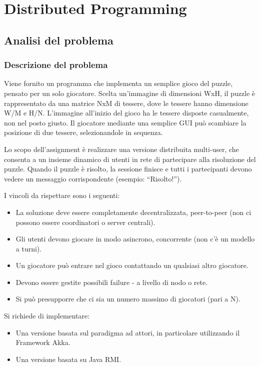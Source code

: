 \chapter{Distributed Programming}
\section{Analisi del problema}
\subsection{Descrizione del problema}
Viene fornito un programma che implementa un semplice gioco del puzzle, pensato per un solo giocatore. Scelta un’immagine di dimensioni WxH, il puzzle è rappresentato da una matrice NxM di tessere, dove le tessere hanno dimensione W/M e H/N. L’immagine all’inizio del gioco ha le tessere disposte casualmente, non nel posto giusto. Il giocatore mediante una semplice GUI può scambiare la posizione di due tessere, selezionandole in sequenza.\newline

\noindent Lo scopo dell'assignment è realizzare una versione distribuita multi-user, che consenta a un insieme dinamico di utenti in rete di partecipare alla risoluzione del puzzle. Quando il puzzle è risolto, la sessione finisce e tutti i partecipanti devono vedere un messaggio corrispondente (esempio: “Risolto!”).\newline

\noindent I vincoli da rispettare sono i seguenti:
\begin{itemize}
    \item La soluzione deve essere completamente decentralizzata, peer-to-peer (non ci possono essere coordinatori o server centrali).
    \item Gli utenti devono giocare in modo asincrono, concorrente (non c'è un modello a turni).
    \item Un giocatore può entrare nel gioco contattando un qualsiasi altro giocatore.
    \item Devono essere gestite possibili failure - a livello di nodo o rete.
    \item Si può presupporre che ci sia un numero massimo di giocatori (pari a N).
\end{itemize}

\noindent Si richiede di implementare:
\begin{itemize}
    \item Una versione basata sul paradigma ad attori, in particolare utilizzando il Framework Akka.
    \item Una versione basata su Java RMI.
\end{itemize}

